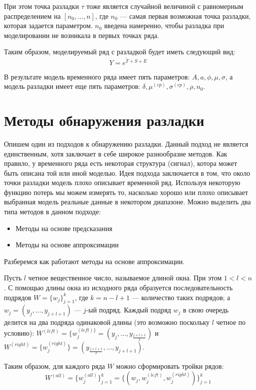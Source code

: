 \documentclass[%
12pt,
master,  %
natbib,      %
subf,        %
substylefile = spbu.rtx,
href,        %
colorlinks,  %
]{disser}
\begin{document}
При этом точка разладки  $\tau$ тоже является случайной величиной с равномерным распределением на $ [n_0, \dots, n ] $, где $ n_0 $ --- самая первая возможная точка разладки, которая задается параметром. $n_0$ введена намеренно, чтобы разладка при моделировании не возникала в первых точках ряда.

Таким образом, моделируемый ряд с разладкой будет иметь следующий вид:
$$ Y = e^{\tilde{T} + S + E}  $$

В результате модель временного ряда имеет пять параметров: $ A, a, \phi, \mu, \sigma $, а модель разладки имеет еще пять параметров: $ \delta, \mu^{(cp)}, \sigma^{(cp)}, \rho, n_0 $.

\section{Методы обнаружения разладки}

Опишем один из подходов к обнаружению разладки. Данный подход не является единственным, хотя заключает в себе широкое разнообразие методов. Как правило, у временного ряда есть некоторая структура (сигнал), котора может быть описана той или иной моделью. Идея подхода заключается в том, что около точки разладки модель плохо описывает временной ряд. Используя некоторую функцию потерь мы можем измерять то, насколько хорошо или плохо описывает выбранная модель реальные данные в некотором диапазоне. 
Можно выделить два типа методов в данном подходе:
\begin{itemize}
	\item Методы на основе предсказания
	\item Методы на основе аппроксимации
\end{itemize}

Разберемся как работают методы на основе аппроксимации.

Пусть $l$ четное вещественное число, называемое длиной окна. При этом  $ 1 < l < n $. С помощью длины окна из исходного ряда образуется последовательность подрядов $W = \{ w_j \}_{j=1}^k$, где $k = n - l + 1$ --- количество таких подрядов; а $ w_j = (y_j, \dots, y_{j+l+1}) $ --- $j$-ый подряд. Каждый подряд  $w_j$  в свою очередь делится на два подряда одинаковой длины (это возможно поскольку $l$ четное по условию): $ W^{(left)} = \{w_j^{(left) \} } =  (y_j, \dots, y_{\frac{j+l+1}{2}})$ и $W^{(right)} = \{w_j^{(right)} \} = (y_{\frac{j+l+1}{2}}, \dots, y_{j+l+1})$.

Таким образом, для каждого ряда $W$ можно сформировать тройки рядов: 
$$ W^{(all)} = \{w_j^{(all)} \}_{j=1}^k =  \{(w_j, w_j^{(left)}, w_j^{(right)}) \}_{j=1}^k  $$
\end{document}
